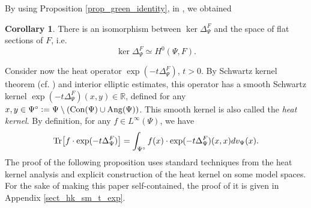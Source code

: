 \documentclass[12pt]{article}
\numberwithin{equation}{section}
\theoremstyle{theorem}
\theoremstyle{definition}
\newtheorem{cor}[thm]{Corollary}
\theoremstyle{remark}
\newcommand{\real}{\mathbb{R}}
\newcommand{\laplcomp}{\Delta}
\newcommand{\tr}[1]{{\rm{Tr}} \big[ #1 \big]}
\begin{document}
		By using Proposition \ref{prop_green_identity}, in \cite[Corollary 2.6]{FinFinDiffer}, we obtained 
	 	\begin{cor}\label{cor_kernel_const}
	 		There is an isomorphism between $\ker \laplcomp_{\Psi}^{F}$ and the space of flat sections of $F$, i.e.
	 		\begin{equation}
	 			\ker \laplcomp_{\Psi}^{F} \simeq H^0(\Psi, F).
	 		\end{equation}
	 	\end{cor}
	 	\par Consider now the heat operator $\exp(-t \laplcomp_{\Psi}^{F})$, $t > 0$. By Schwartz kernel theorem (cf. \cite[Proposition 2.14]{BGV}) and interior elliptic estimates, this operator has a smooth Schwartz kernel $\exp(-t \laplcomp_{\Psi}^{F})(x, y) \in \real$, defined for any $x, y \in \Psi^{\circ} := \Psi \setminus ({\rm{Con}}(\Psi) \cup{\rm{Ang}}(\Psi))$. This smooth kernel is also called the \textit{heat kernel}. By definition, for any $f \in L^{\infty}(\Psi)$, we have
	 	\begin{equation}\label{eq_defn_hk_mult_f}
	 		\tr{f  \cdot \exp(-t \laplcomp_{\Psi}^{F})} = \int_{\Psi^{\circ}} f(x) \cdot \exp(-t \laplcomp_{\Psi}^{F})(x, x) dv_{\Psi}(x).
	 	\end{equation}
	 	The proof of the following proposition uses standard techniques from the heat kernel analysis and explicit construction of the heat kernel on some model spaces. For the sake of making this paper self-contained, the proof of it is given in Appendix \ref{sect_hk_sm_t_exp}.
\end{document}
